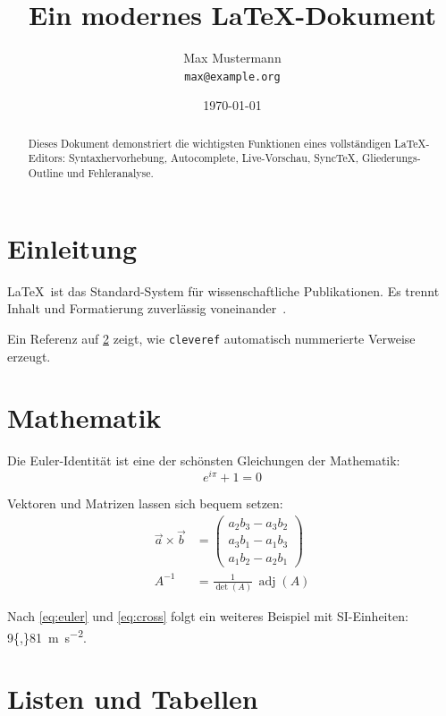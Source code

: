 \documentclass[12pt,a4paper]{article}
\title{Ein modernes \LaTeX-Dokument}
\author{Max Mustermann \\ \texttt{max@example.org}}
\date{\today}
\begin{document}
\maketitle

\begin{abstract}
  Dieses Dokument demonstriert die wichtigsten Funktionen eines vollständigen
  \LaTeX-Editors: Syntaxhervorhebung, Autocomplete, Live-Vorschau, SyncTeX,
  Gliederungs-Outline und Fehleranalyse.
\end{abstract}

\tableofcontents
\newpage

\section{Einleitung}
\label{sec:intro}
\LaTeX\ ist das Standard-System für wissenschaftliche Publikationen. Es trennt
Inhalt und Formatierung zuverlässig voneinander~\cite{lamport1994}.

Ein Referenz auf \cref{sec:math} zeigt, wie \texttt{cleveref} automatisch
nummerierte Verweise erzeugt.

\section{Mathematik}
\label{sec:math}

Die Euler-Identität ist eine der schönsten Gleichungen der Mathematik:
\begin{equation}
  \label{eq:euler}
  e^{i\pi} + 1 = 0
\end{equation}

Vektoren und Matrizen lassen sich bequem setzen:
\begin{align}
  \vec{a} \times \vec{b} &= \begin{pmatrix} a_2b_3 - a_3b_2 \\ a_3b_1 - a_1b_3 \\ a_1b_2 - a_2b_1 \end{pmatrix}
  \label{eq:cross}\\
  A^{-1} &= \frac{1}{\det(A)}\,\operatorname{adj}(A)
  \label{eq:inv}
\end{align}

Nach \cref{eq:euler} und \cref{eq:cross} folgt ein weiteres Beispiel mit
SI-Einheiten: \SI{9{,}81}{\meter\per\square\second}.

\section{Listen und Tabellen}
\end{document}

